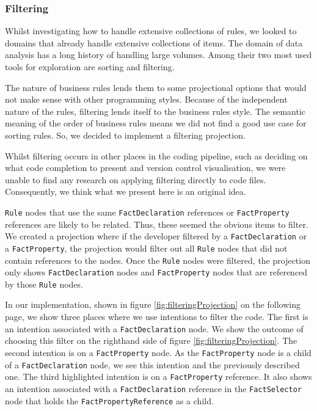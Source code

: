 \subsubsection{Filtering}
Whilst investigating how to handle extensive collections of rules, we looked to domains that already handle extensive collections of items.
The domain of data analysis has a long history of handling large volumes.
Among their two most used tools for exploration are sorting and filtering.

The nature of business rules lends them to some projectional options that would not make sense with other programming styles.
Because of the independent nature of the rules, filtering lends itself to the business rules style.
The semantic meaning of the order of business rules means we did not find a good use case for sorting rules.
So, we decided to implement a filtering projection.

Whilst filtering occurs in other places in the coding pipeline, such as deciding on what code completion to present\cite{hou2010towards} and version control visualisation\cite{yoon2013visualization}, we were unable to find any research on applying filtering directly to code files.
Consequently, we think what we present here is an original idea.

\texttt{Rule} nodes that use the same \texttt{FactDeclaration} references or \texttt{FactProperty} references are likely to be related.
Thus, these seemed the obvious items to filter.
We created a projection where if the developer filtered by a \texttt{FactDeclaration} or a \texttt{FactProperty}, the projection would filter out all \texttt{Rule} nodes that did not contain references to the nodes.
Once the \texttt{Rule} nodes were filtered, the projection only shows \texttt{FactDeclaration} nodes and \texttt{FactProperty} nodes that are referenced by those \texttt{Rule} nodes.

In our implementation, shown in figure \ref{fig:filteringProjection} on the following page, we show three places where we use intentions to filter the code.
The first is an intention associated with a \texttt{FactDeclaration} node.
We show the outcome of choosing this filter on the righthand side of figure \ref{fig:filteringProjection}.
The second intention is on a \texttt{FactProperty} node.
As the \texttt{FactProperty} node is a child of a \texttt{FactDeclaration} node, we see this intention and the previously described one.
The third highlighted intention is on a \texttt{FactProperty} reference.
It also shows an intention associated with a \texttt{FactDeclaration} reference in the \texttt{FactSelector} node that holds the \texttt{FactPropertyReference} as a child.

